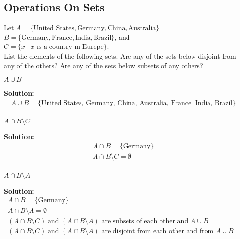 \subsection{Operations On Sets}

\begin{tcolorbox}[title=Problem 2, breakable]
Let $A = \{\text{United States}, \text{Germany}, \text{China}, \text{Australia}\}$,\\
$B = \{\text{Germany}, \text{France}, \text{India}, \text{Brazil}\}$, and\\
$C = \{x \mid x \text{ is a country in Europe}\}$.\\

List the elements of the following sets. Are any of the sets below disjoint from any 
of the others? Are any of the sets below subsets of any others?
\end{tcolorbox}

\begin{tcolorbox}[title=Problem 2 (a), breakable]
$A \cup B$ 
\end{tcolorbox}

\textbf{Solution:}
\begin{align*}
A \cup B = \text{\{United States, Germany, China, Australia, France, India, Brazil\}} & \\
\end{align*}

\begin{tcolorbox}[title=Problem 2 (b), breakable]
$A \cap B \setminus C$
\end{tcolorbox}

\textbf{Solution:}
\begin{align*}
A \cap B = \text{\{Germany\}} & \\
A \cap B \setminus C = \emptyset  & \\
\end{align*}

\begin{tcolorbox}[title=Problem 2 (c), breakable]
$A \cap B \setminus A$
\end{tcolorbox}

\textbf{Solution:}
\begin{align*}
A \cap B = \text{\{Germany\}} & \\
A \cap B \setminus A = \emptyset && \\
(A \cap B \setminus C) \text{ and } (A \cap B \setminus A) \text{ are subsets of each other and } A \cup B& \\
(A \cap B \setminus C) \text{ and } (A \cap B \setminus A) \text{ are disjoint from each other and from } A \cup B& \\
\end{align*}

